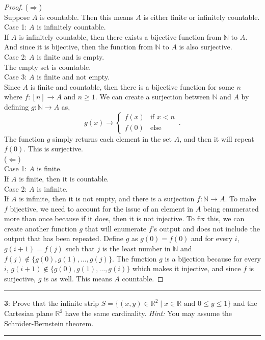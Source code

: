 \documentclass[11pt]{article}
\newcommand\question[2]{\vspace{.25in}\hrule\textbf{#1}: #2\vspace{.5em}\hrule\vspace{.10in}}
\newcommand{\R}{\mathbb{R}}
\newcommand{\N}{\mathbb{N}}
\begin{document}
\begin{proof}
	($\Longrightarrow$)\\
	Suppose $A$ is countable. Then this means $A$ is either finite or infinitely countable.\\
	Case 1: $A$ is infinitely countable.\\
	If $A$ is infinitely countable, then there exists a bijective function from $\N$ to $A$. And since it is bijective, then the function from $\N$ to $A$ is also surjective.\\
	Case 2: $A$ is finite and is empty.\\
	The empty set is countable.\\
	Case 3: $A$ is finite and not empty.\\
	Since $A$ is finite and countable, then there is a bijective function for some $n$ where $f:[n] \rightarrow A$ and $n \ge 1$. We can create a surjection between $\N$ and $A$ by defining $g: \N \rightarrow A$ as,
	\begin{equation*}
		g(x) \rightarrow
		\begin{cases}
			f(x) & \text{if $x < n$}\\
			f(0) & \text{else}
		\end{cases}\,.
	\end{equation*}
	The function $g$ simply returns each element in the set $A$, and then it will repeat $f(0)$. This is surjective.\\
	($\Longleftarrow$)\\
	Case 1: $A$ is finite.\\
	If $A$ is finite, then it is countable.\\
	Case 2: $A$ is infinite.\\
	If $A$ is infinite, then it is not empty, and there is a surjection $f: \N \rightarrow A$. To make $f$ bijective, we need to account for the issue of an element in $A$ being enumerated more than once because if it does, then it is not injective. To fix this, we can create another function $g$ that will enumerate $f$'s output and does not include the output that has been repeated. Define $g$ as $g(0) = f(0)$ and for every $i$, $g(i+1) = f(j)$ such that $j$ is the least number in $\N$ and $f(j) \not\in \{g(0), g(1), \ldots, g(j)\}$. The function $g$ is a bijection because for every $i$, $g(i+1) \not\in \{g(0), g(1), \ldots, g(i)\}$ which makes it injective, and since $f$ is surjective, $g$ is as well. This means $A$ countable.  
\end{proof}


\question{3}{Prove that the infinite strip $S = \{(x,y) \in \R^2 \mid x \in \R \text{ and } 0 \le y \le 1 \}$ and the Cartesian plane $\R^2$ have the same cardinality. \textit{Hint:} You may assume the Schröder-Bernstein theorem.}
\end{document}
